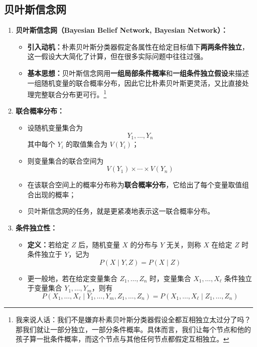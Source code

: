 \documentclass[../main.tex]{subfiles}
\begin{document}
\subsection{贝叶斯信念网}\label{sec:bayesian-belief-net}
\begin{enumerate}
    \item \textbf{贝叶斯信念网（Bayesian Belief Network, Bayesian Network）：}
    \begin{itemize}
        \item \textbf{引入动机：}朴素贝叶斯分类器假定各属性在给定目标值下\textbf{两两条件独立}，这一假设大大简化了计算，但在很多实际问题中往往过强。
        \item \textbf{基本思想：}贝叶斯信念网用\textbf{一组局部条件概率}和\textbf{一组条件独立假设}来描述一组随机变量的联合概率分布，因此它比朴素贝叶斯更灵活，又比直接处理完整联合分布更可行。\footnote{我来说人话：我们不是嫌弃朴素贝叶斯分类器假设全都互相独立太过分了吗？那我们就让一部分独立，一部分条件概率。具体而言，我们让每个节点和他的孩子算一批条件概率，而这个节点与其他任何节点都假定互相独立。}
    \end{itemize}

    \item \textbf{联合概率分布：}
    \begin{itemize}
        \item 设随机变量集合为
        $$
        Y_1,\ldots,Y_n
        $$
        其中每个 $Y_i$ 的取值集合为 $V(Y_i)$；
        \item 则变量集合的联合空间为
        $$
        V(Y_1)\times\cdots\times V(Y_n)
        $$
        \item 在该联合空间上的概率分布称为\textbf{联合概率分布}，它给出了每个变量取值组合出现的概率；
        \item 贝叶斯信念网的任务，就是更紧凑地表示这一联合概率分布。
    \end{itemize}

    \item \textbf{条件独立性：}
    \begin{itemize}
        \item \textbf{定义：}若给定 $Z$ 后，随机变量 $X$ 的分布与 $Y$ 无关，则称 $X$ 在给定 $Z$ 时条件独立于 $Y$，记为
        $$
        P(X\mid Y,Z)=P(X\mid Z)
        $$
        \item 更一般地，若在给定变量集合 $Z_1,\ldots,Z_n$ 时，变量集合 $X_1,\ldots,X_\ell$ 条件独立于变量集合 $Y_1,\ldots,Y_m$，则有
        $$
        P(X_1,\ldots,X_\ell\mid Y_1,\ldots,Y_m,Z_1,\ldots,Z_n)
        =
        P(X_1,\ldots,X_\ell\mid Z_1,\ldots,Z_n)
        $$
    \end{itemize}


\end{enumerate}
\end{document}
